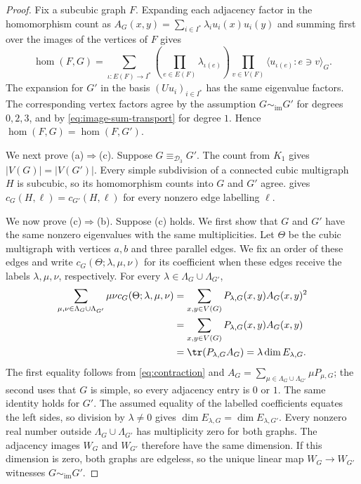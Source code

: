 \begin{proof}
Fix a subcubic graph $F$. Expanding each adjacency factor in the
homomorphism count as
$A_G(x,y)=\sum_{i\in I^*}\lambda_i u_i(x)u_i(y)$
and summing first over the images of the vertices of $F$ gives
\begin{equation}\label{eq:image-hom-expansion}
 \hom(F,G)=\sum_{\iota:E(F)\to I^*}
 \left(\prod_{e\in E(F)}\lambda_{\iota(e)}\right)
 \prod_{v\in V(F)}\bigl\langle u_{\iota(e)}:e\ni v\bigr\rangle_G.
\end{equation}
The expansion for $G'$ in the basis $(Uu_i)_{i\in I^*}$ has the same
eigenvalue factors. The corresponding vertex factors agree by the
assumption $G\sim_{\mathrm{im}}G'$ for degrees $0,2,3$, and by
\cref{eq:image-sum-transport} for degree $1$.
Hence $\hom(F,G)=\hom(F,G')$.

We next prove (a)$\Rightarrow$(c).
Suppose $G\equiv_{\mathcal D_3}G'$. The count from $K_1$ gives
$|V(G)|=|V(G')|$. Every simple subdivision of a connected cubic multigraph $H$ is subcubic,
so its homomorphism counts into $G$ and $G'$ agree.
 gives
$c_G(H,\ell)=c_{G'}(H,\ell)$ for every nonzero edge labelling $\ell$.

We now prove (c)$\Rightarrow$(b). Suppose (c) holds.
We first show that $G$ and $G'$ have the same nonzero eigenvalues with
the same multiplicities. Let $\Theta$ be the cubic multigraph with
vertices $a,b$ and three parallel edges. We fix an order of these edges and write
$c_G(\Theta;\lambda,\mu,\nu)$ for its coefficient when these edges
receive the labels $\lambda,\mu,\nu$, respectively.
For every $\lambda\in\Lambda_G\cup\Lambda_{G'}$,
\begin{equation}\label{eq:theta-multiplicity}
 \begin{aligned}
 \sum_{\mu,\nu\in\Lambda_G\cup\Lambda_{G'}}\mu\nu c_G(\Theta;\lambda,\mu,\nu)
 &=\sum_{x,y\in V(G)}P_{\lambda,G}(x,y)A_G(x,y)^2\\
 &=\sum_{x,y\in V(G)}P_{\lambda,G}(x,y)A_G(x,y)\\
 &=\tr(P_{\lambda,G}A_G)
 =\lambda\dim E_{\lambda,G}.
 \end{aligned}
\end{equation}
The first equality follows from \cref{eq:contraction} and
$A_G=\sum_{\mu\in\Lambda_G\cup\Lambda_{G'}}\mu P_{\mu,G}$; the second uses that $G$ is
simple, so every adjacency entry is $0$ or $1$.
The same identity holds for $G'$. The assumed equality of the labelled coefficients equates the left sides,
so division by $\lambda\ne0$ gives
$\dim E_{\lambda,G}=\dim E_{\lambda,G'}$.
Every nonzero real number outside $\Lambda_G\cup\Lambda_{G'}$ has multiplicity zero for
both graphs.
The adjacency images $W_G$ and $W_{G'}$ therefore have the same dimension.
If this dimension is zero, both graphs are edgeless, so the unique
linear map $W_G\to W_{G'}$ witnesses $G\sim_{\mathrm{im}}G'$.


\end{proof}

